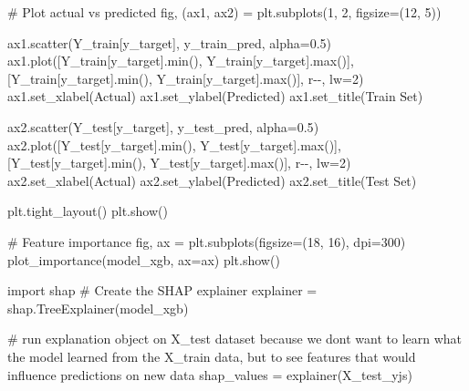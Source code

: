 \documentclass[
  letterpaper,
  DIV=11,
  numbers=noendperiod]{scrartcl}
\newenvironment{Shaded}{\begin{snugshade}}{\end{snugshade}}
\newcommand{\BuiltInTok}[1]{\textcolor[rgb]{0.00,0.23,0.31}{#1}}
\newcommand{\CommentTok}[1]{\textcolor[rgb]{0.37,0.37,0.37}{#1}}
\newcommand{\DecValTok}[1]{\textcolor[rgb]{0.68,0.00,0.00}{#1}}
\newcommand{\FloatTok}[1]{\textcolor[rgb]{0.68,0.00,0.00}{#1}}
\newcommand{\ImportTok}[1]{\textcolor[rgb]{0.00,0.46,0.62}{#1}}
\newcommand{\NormalTok}[1]{\textcolor[rgb]{0.00,0.23,0.31}{#1}}
\newcommand{\OperatorTok}[1]{\textcolor[rgb]{0.37,0.37,0.37}{#1}}
\newcommand{\StringTok}[1]{\textcolor[rgb]{0.13,0.47,0.30}{#1}}
\begin{document}
\begin{Shaded}
\begin{Highlighting}[]
\CommentTok{\# Plot actual vs predicted}
\NormalTok{fig, (ax1, ax2) }\OperatorTok{=}\NormalTok{ plt.subplots(}\DecValTok{1}\NormalTok{, }\DecValTok{2}\NormalTok{, figsize}\OperatorTok{=}\NormalTok{(}\DecValTok{12}\NormalTok{, }\DecValTok{5}\NormalTok{))}

\NormalTok{ax1.scatter(Y\_train[y\_target], y\_train\_pred, alpha}\OperatorTok{=}\FloatTok{0.5}\NormalTok{)}
\NormalTok{ax1.plot([Y\_train[y\_target].}\BuiltInTok{min}\NormalTok{(), Y\_train[y\_target].}\BuiltInTok{max}\NormalTok{()], [Y\_train[y\_target].}\BuiltInTok{min}\NormalTok{(), Y\_train[y\_target].}\BuiltInTok{max}\NormalTok{()], }\StringTok{\textquotesingle{}r{-}{-}\textquotesingle{}}\NormalTok{, lw}\OperatorTok{=}\DecValTok{2}\NormalTok{)}
\NormalTok{ax1.set\_xlabel(}\StringTok{\textquotesingle{}Actual\textquotesingle{}}\NormalTok{)}
\NormalTok{ax1.set\_ylabel(}\StringTok{\textquotesingle{}Predicted\textquotesingle{}}\NormalTok{)}
\NormalTok{ax1.set\_title(}\StringTok{\textquotesingle{}Train Set\textquotesingle{}}\NormalTok{)}

\NormalTok{ax2.scatter(Y\_test[y\_target], y\_test\_pred, alpha}\OperatorTok{=}\FloatTok{0.5}\NormalTok{)}
\NormalTok{ax2.plot([Y\_test[y\_target].}\BuiltInTok{min}\NormalTok{(), Y\_test[y\_target].}\BuiltInTok{max}\NormalTok{()], [Y\_test[y\_target].}\BuiltInTok{min}\NormalTok{(), Y\_test[y\_target].}\BuiltInTok{max}\NormalTok{()], }\StringTok{\textquotesingle{}r{-}{-}\textquotesingle{}}\NormalTok{, lw}\OperatorTok{=}\DecValTok{2}\NormalTok{)}
\NormalTok{ax2.set\_xlabel(}\StringTok{\textquotesingle{}Actual\textquotesingle{}}\NormalTok{)}
\NormalTok{ax2.set\_ylabel(}\StringTok{\textquotesingle{}Predicted\textquotesingle{}}\NormalTok{)}
\NormalTok{ax2.set\_title(}\StringTok{\textquotesingle{}Test Set\textquotesingle{}}\NormalTok{)}

\NormalTok{plt.tight\_layout()}
\NormalTok{plt.show()}

\CommentTok{\# Feature importance}
\NormalTok{fig, ax }\OperatorTok{=}\NormalTok{ plt.subplots(figsize}\OperatorTok{=}\NormalTok{(}\DecValTok{18}\NormalTok{, }\DecValTok{16}\NormalTok{), dpi}\OperatorTok{=}\DecValTok{300}\NormalTok{)}
\NormalTok{plot\_importance(model\_xgb, ax}\OperatorTok{=}\NormalTok{ax)}
\NormalTok{plt.show()}

\ImportTok{import}\NormalTok{ shap}
\CommentTok{\# Create the SHAP explainer}
\NormalTok{explainer }\OperatorTok{=}\NormalTok{ shap.TreeExplainer(model\_xgb)}

\CommentTok{\# run explanation object on X\_test dataset because we don\textquotesingle{}t want to learn what the model learned from the X\_train data, but to see features that would influence predictions on new data}
\NormalTok{shap\_values }\OperatorTok{=}\NormalTok{ explainer(X\_test\_yjs)}


\end{Highlighting}
\end{Shaded}
\end{document}
